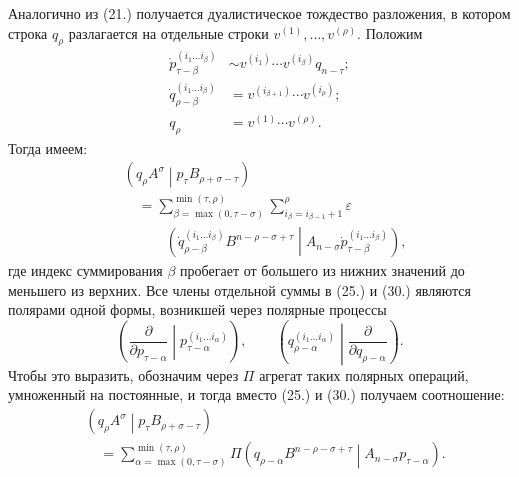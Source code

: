\documentclass[11pt]{article}
\newcommand{\pair}[2]{\left(#1\middle|#2\right)}
\newcommand{\eps}{\varepsilon}
\begin{document}
Аналогично из (21.) получается дуалистическое тождество разложения, в котором строка $q_\rho$ разлагается на отдельные строки $v^{(1)},\ldots,v^{(\rho)}$. Положим
\begin{equation}
\begin{aligned}
 \dot p_{\tau-\beta}^{(i_1\ldots i_\beta)}
&\sim v^{(i_1)}\cdots v^{(i_\beta)}q_{n-\tau};\\
 \dot q_{\rho-\beta}^{(i_1\ldots i_\beta)}
&=v^{(i_{\beta+1})}\cdots v^{(i_\rho)};\\
 q_\rho&=v^{(1)}\cdots v^{(\rho)}.
\end{aligned}
\tag{29}
\end{equation}
Тогда имеем:
\begin{equation}
\begin{aligned}
&\pair{q_\rho A^\sigma}{p_\tau B_{\rho+\sigma-\tau}}\\
&\quad=\sum_{\beta=\max(0,\tau-\sigma)}^{\min(\tau,\rho)}
\sum_{i_\beta=i_{\beta-1}+1}^{\rho}\eps\\
&\qquad\quad\pair{\dot q_{\rho-\beta}^{(i_1\ldots i_\beta)}
B^{n-\rho-\sigma+\tau}}
{A_{n-\sigma}\dot p_{\tau-\beta}^{(i_1\ldots i_\beta)}} ,
\end{aligned}
\tag{30}
\end{equation}
где индекс суммирования $\beta$ пробегает от большего из нижних значений до меньшего из верхних. Все члены отдельной суммы в (25.) и (30.) являются полярами одной формы, возникшей через полярные процессы
\[
\left(\frac{\partial}{\partial p_{\tau-\alpha}}\middle|
p_{\tau-\alpha}^{(i_1\ldots i_\alpha)}\right),\qquad
\left(q_{\rho-\alpha}^{(i_1\ldots i_\alpha)}\middle|
\frac{\partial}{\partial q_{\rho-\alpha}}\right).
\]
Чтобы это выразить, обозначим через $\Pi$ агрегат таких полярных операций, умноженный на постоянные, и тогда вместо (25.) и (30.) получаем соотношение:
\begin{equation}
\begin{aligned}
&\pair{q_\rho A^\sigma}{p_\tau B_{\rho+\sigma-\tau}}\\
&\quad=\sum_{\alpha=\max(0,\tau-\sigma)}^{\min(\tau,\rho)}
\Pi\pair{q_{\rho-\alpha}B^{n-\rho-\sigma+\tau}}
{A_{n-\sigma}p_{\tau-\alpha}}.
\end{aligned}
\tag{31}
\end{equation}
\end{document}
